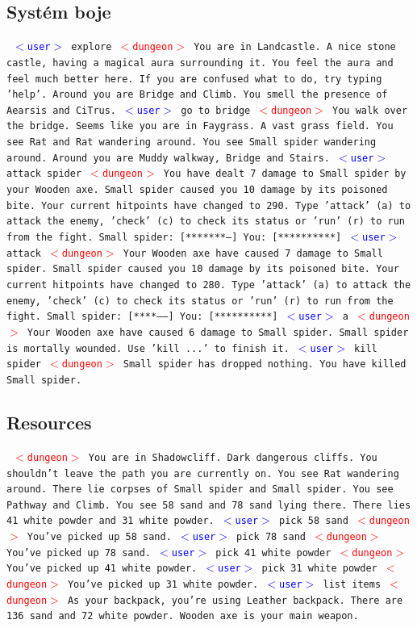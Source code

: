 \documentclass[11pt, a4paper]{article}
\newenvironment{example}%
{\smallskip\noindent\ignorespaces\obeylines\tt}%
{\smallskip\par\noindent
\ignorespacesafterend}
\def\user{\textcolor{blue}{$<$user$>$ }}
\def\dung{\textcolor{red}{$<$dungeon$>$ }}
\begin{document}
\subsection{Systém boje}
\begin{example}
\user explore
\dung You are in Landcastle. A nice stone castle, having a magical aura surrounding it. You feel the aura and feel much better here. If you are confused what to do, try typing 'help'. Around you are Bridge and Climb. You smell the presence of Aearsis and CiTrus.
\user go to bridge
\dung You walk over the bridge. Seems like you are in Faygrass. A vast grass field. You see Rat and Rat wandering around. You see Small spider wandering around. Around you are Muddy walkway, Bridge and Stairs.
\user attack spider
\dung You have dealt 7 damage to Small spider by your Wooden axe. Small spider caused you 10 damage by its poisoned bite. Your current hitpoints have changed to 290. Type 'attack' (a) to attack the enemy, 'check' (c) to check its status or 'run' (r) to run from the fight. 
Small spider: [*******---]     You: [**********]
\user attack
\dung Your Wooden axe have caused 7 damage to Small spider. Small spider caused you 10 damage by its poisoned bite. Your current hitpoints have changed to 280. Type 'attack' (a) to attack the enemy, 'check' (c) to check its status or 'run' (r) to run from the fight. 
Small spider: [****------]     You: [**********]
\user a
\dung Your Wooden axe have caused 6 damage to Small spider. Small spider is mortally wounded. Use 'kill ...' to finish it.
\user kill spider
\dung Small spider has dropped nothing. You have killed Small spider.
\end{example}
\subsection{Resources}
\begin{example}
\dung You are in Shadowcliff. Dark dangerous cliffs. You shouldn't leave the path you are currently on. You see Rat wandering around. There lie corpses of Small spider and Small spider. You see Pathway and Climb. You see 58 sand and 78 sand lying there. There lies 41 white powder and 31 white powder.
\user pick 58 sand
\dung You've picked up 58 sand.
\user pick 78 sand
\dung You've picked up 78 sand.
\user pick 41 white powder
\dung You've picked up 41 white powder.
\user pick 31 white powder
\dung You've picked up 31 white powder.
\user list items
\dung As your backpack, you're using Leather backpack. There are 136 sand and 72 white powder. Wooden axe is your main weapon.
\end{example}
\end{document}
